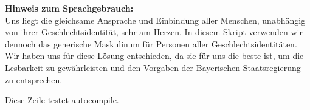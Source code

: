 \documentclass[11pt,a4paper]{book}
\begin{document}
\lipsum[2]

\vfill
\textbf{Hinweis zum Sprachgebrauch:} \\
Uns liegt die gleichsame Ansprache und Einbindung aller Menschen, unabhängig von ihrer Geschlechtsidentität, sehr am Herzen. In diesem Skript verwenden wir dennoch das generische Maskulinum für Personen aller Geschlechtsidentitäten. Wir haben uns für diese Lösung entschieden, da sie für uns die beste ist, um die Lesbarkeit zu gewährleisten und den Vorgaben der Bayerischen Staatsregierung zu entsprechen.



\tableofcontents
\newpage

\restoregeometry %




Diese Zeile testet autocompile.

\printbibliography


\end{document}
